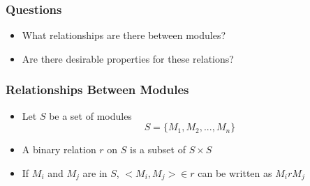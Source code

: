 \documentclass[t,12pt,numbers,fleqn]{beamer}
\begin{document}



\begin{frame}
\frametitle{Questions}

\begin{itemize}
\item What relationships are there between modules?
\item Are there desirable properties for these relations?
\end{itemize}

\end{frame}


\begin{frame}
\frametitle{Relationships Between Modules}

\begin{itemize}
\item Let $S$ be a set of modules
$$ S = \{ M_1, M_2, ..., M_n \}$$
\item A binary relation $r$ on $S$ is a subset of $S \times S$
\item If $M_i$ and $M_j$ are in $S$, $< M_i, M_j > \in r$ can be written as $M_i r M_j$
\end{itemize} 

\end{frame}
\end{document}
